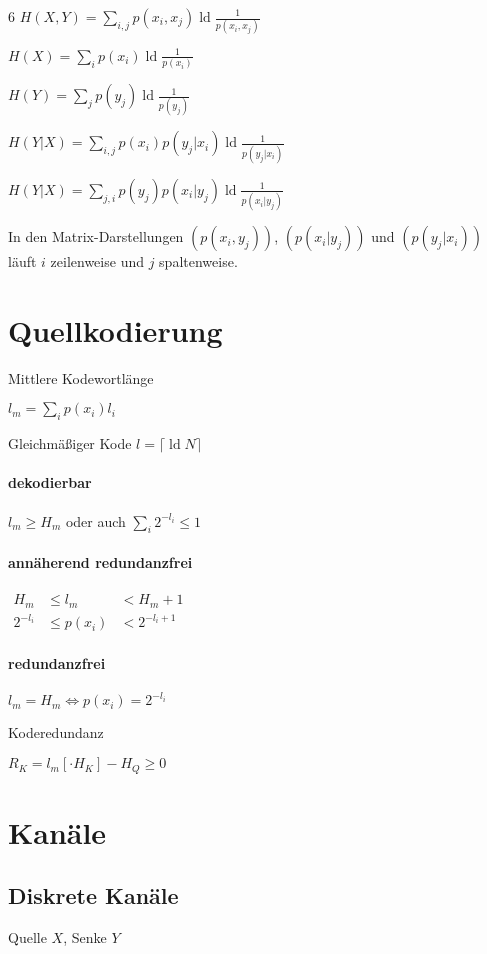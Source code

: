 \documentclass[8pt,a4paper,landscape]{extarticle}
\DeclareMathOperator*{\ld}{ld}
\begin{document}
\begin{multicols*}{6}
$H(X,Y) =
\boxed{\sum_{i, j} p(x_i, x_j) \ld \frac{1}{p(x_i, x_j)}}$


$H(X) = \sum_i p(x_i) \ld \frac{1}{p(x_i)}$

$H(Y) = \sum_j p(y_j) \ld \frac{1}{p(y_j)}$

$H(Y|X) = \boxed{\sum_{i, j} p(x_i) p(y_j | x_i) \ld \frac{1}{p(y_j | x_i)}}$

$H(Y|X) = \boxed{\sum_{j, i} p(y_j) p(x_i | y_j) \ld \frac{1}{p(x_i | y_j)}}$

In den Matrix-Darstellungen $(p(x_i, y_j))$, $(p(x_i|y_j))$ und $(p(y_j|x_i))$ läuft $i$ zeilenweise und $j$ spaltenweise.

\section{Quellkodierung}
Mittlere Kodewortlänge

$\boxed{l_m = \sum_i p(x_i) l_i}$

Gleichmäßiger Kode $l = \lceil \ld N \rceil$

\paragraph{dekodierbar}
$l_m \geq H_m$ oder auch $\sum_i 2^{-l_i} \leq 1$

\paragraph{annäherend redundanzfrei}
$\begin{alignedat}{2}
	H_m	 &\leq l_m    &< H_m + 1 \\
	2^{-l_i} &\leq p(x_i) &< 2^{-l_i +1}
\end{alignedat}$

\paragraph{redundanzfrei}
$l_m = H_m \Leftrightarrow p(x_i) = 2^{-l_i}$

Koderedundanz

$\boxed{R_K = l_{m} \left[ \cdot H_K\right] - H_Q \geq 0}$

\section{Kanäle}
\subsection{Diskrete Kanäle}
Quelle $X$, Senke $Y$


\end{multicols*}
\end{document}
